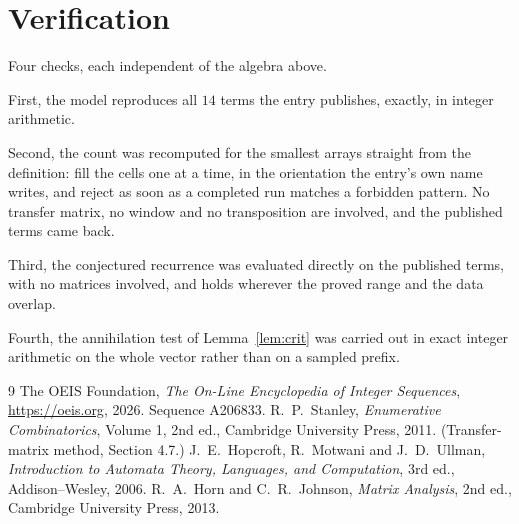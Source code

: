 \documentclass[11pt,a4paper]{article}
\theoremstyle{plain}
\theoremstyle{definition}
\begin{document}
\section{Verification}

Four checks, each independent of the algebra above.

First, the model reproduces all $14$ terms the entry publishes, exactly, in integer
arithmetic.

Second, the count was recomputed for the smallest arrays straight from the definition: fill the
cells one at a time, in the orientation the entry's own name writes, and reject as soon as a
completed run matches a forbidden pattern. No transfer matrix, no window and no transposition
are involved, and the published terms came back.

Third, the conjectured recurrence was evaluated directly on the published terms, with no
matrices involved, and holds wherever the proved range and the data overlap.

Fourth, the annihilation test of Lemma~\ref{lem:crit} was carried out in exact integer
arithmetic on the whole vector rather than on a sampled prefix.

\begin{thebibliography}{9}
 The OEIS Foundation, \emph{The On-Line Encyclopedia of Integer
Sequences}, \url{https://oeis.org}, 2026. Sequence A206833.
 R.~P.~Stanley, \emph{Enumerative Combinatorics}, Volume 1, 2nd ed.,
Cambridge University Press, 2011. (Transfer-matrix method, Section 4.7.)
 J.~E.~Hopcroft, R.~Motwani and J.~D.~Ullman, \emph{Introduction to Automata
Theory, Languages, and Computation}, 3rd ed., Addison--Wesley, 2006.
 R.~A.~Horn and C.~R.~Johnson, \emph{Matrix Analysis}, 2nd ed., Cambridge
University Press, 2013.
\end{thebibliography}
\end{document}
